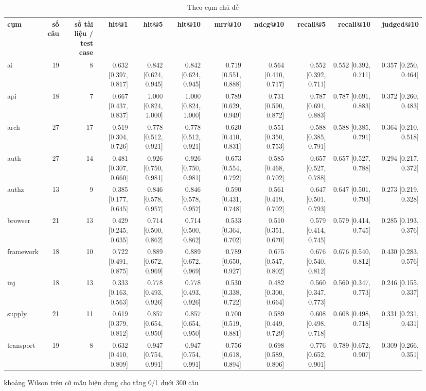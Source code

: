 \begin{table}[ht]
\centering
\caption{Theo cụm chủ đề}
\begin{tabular}{lrrrrrrrrrr}
\toprule
cụm & số câu & số tài liệu / test case & hit@1 & hit@5 & hit@10 & mrr@10 & ndcg@10 & recall@5 & recall@10 & judged@10 \\
\midrule
ai & 19 & 8 & 0.632 [0.397, 0.817] & 0.842 [0.624, 0.945] & 0.842 [0.624, 0.945] & 0.719 [0.551, 0.888] & 0.564 [0.410, 0.717] & 0.552 [0.392, 0.711] & 0.552 [0.392, 0.711] & 0.357 [0.250, 0.464] \\
api & 18 & 7 & 0.667 [0.437, 0.837] & 1.000 [0.824, 1.000] & 1.000 [0.824, 1.000] & 0.789 [0.629, 0.949] & 0.731 [0.590, 0.872] & 0.787 [0.691, 0.883] & 0.787 [0.691, 0.883] & 0.372 [0.260, 0.483] \\
arch & 27 & 17 & 0.519 [0.304, 0.726] & 0.778 [0.512, 0.921] & 0.778 [0.512, 0.921] & 0.620 [0.410, 0.831] & 0.551 [0.350, 0.753] & 0.588 [0.385, 0.791] & 0.588 [0.385, 0.791] & 0.364 [0.210, 0.518] \\
auth & 27 & 14 & 0.481 [0.307, 0.660] & 0.926 [0.750, 0.981] & 0.926 [0.750, 0.981] & 0.673 [0.554, 0.792] & 0.585 [0.468, 0.702] & 0.657 [0.527, 0.788] & 0.657 [0.527, 0.788] & 0.294 [0.217, 0.372] \\
authz & 13 & 9 & 0.385 [0.177, 0.645] & 0.846 [0.578, 0.957] & 0.846 [0.578, 0.957] & 0.590 [0.431, 0.748] & 0.561 [0.419, 0.702] & 0.647 [0.501, 0.793] & 0.647 [0.501, 0.793] & 0.273 [0.219, 0.328] \\
browser & 21 & 13 & 0.429 [0.245, 0.635] & 0.714 [0.500, 0.862] & 0.714 [0.500, 0.862] & 0.533 [0.364, 0.702] & 0.510 [0.351, 0.670] & 0.579 [0.414, 0.745] & 0.579 [0.414, 0.745] & 0.285 [0.193, 0.376] \\
framework & 18 & 10 & 0.722 [0.491, 0.875] & 0.889 [0.672, 0.969] & 0.889 [0.672, 0.969] & 0.789 [0.650, 0.927] & 0.675 [0.547, 0.802] & 0.676 [0.540, 0.812] & 0.676 [0.540, 0.812] & 0.430 [0.283, 0.576] \\
inj & 18 & 13 & 0.333 [0.163, 0.563] & 0.778 [0.493, 0.926] & 0.778 [0.493, 0.926] & 0.530 [0.338, 0.722] & 0.482 [0.300, 0.664] & 0.560 [0.347, 0.773] & 0.560 [0.347, 0.773] & 0.246 [0.155, 0.337] \\
supply & 21 & 11 & 0.619 [0.379, 0.812] & 0.857 [0.654, 0.950] & 0.857 [0.654, 0.950] & 0.700 [0.519, 0.881] & 0.589 [0.449, 0.729] & 0.608 [0.498, 0.718] & 0.608 [0.498, 0.718] & 0.331 [0.231, 0.431] \\
transport & 19 & 8 & 0.632 [0.410, 0.809] & 0.947 [0.754, 0.991] & 0.947 [0.754, 0.991] & 0.756 [0.618, 0.894] & 0.698 [0.589, 0.806] & 0.776 [0.652, 0.901] & 0.789 [0.672, 0.907] & 0.309 [0.266, 0.351] \\
\bottomrule
\end{tabular}
\par\smallskip\footnotesize khoảng Wilson trên cỡ mẫu hiệu dụng cho tầng 0/1 dưới 300 câu
\end{table}

